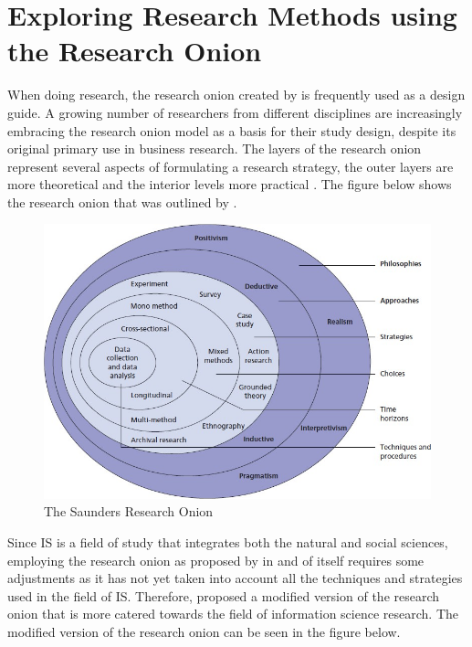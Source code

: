 \section{Exploring Research Methods using the Research Onion}
\par{When doing research, the research onion created by \cite{saunders2009research} is frequently used as a design guide. A growing number of researchers from different disciplines are increasingly embracing the research onion model as a basis for their study design, despite its original primary use in business research. The layers of the research onion represent several aspects of formulating a research strategy, the outer layers are more theoretical and the interior levels more practical \citep{saunders2009research}. The figure below shows the research onion that was outlined by \cite{saunders2009research}.}
\begin{figure}[h!]
    \centering
    \includegraphics[width=1\linewidth]{img/Saunders research onion.jpg}
    \caption{The Saunders Research Onion}
    \label{fig:enter-label}
\end{figure}
\par{Since IS is a field of study that integrates both the natural and social sciences, employing the research onion as proposed by \cite{saunders2009research} in and of itself requires some adjustments as it has not yet taken into account all the techniques and strategies used in the field of IS. Therefore, \cite{mardiana2020modifying} proposed a modified version of the research onion that is more catered towards the field of information science research. The modified version of the research onion can be seen in the figure below.}
